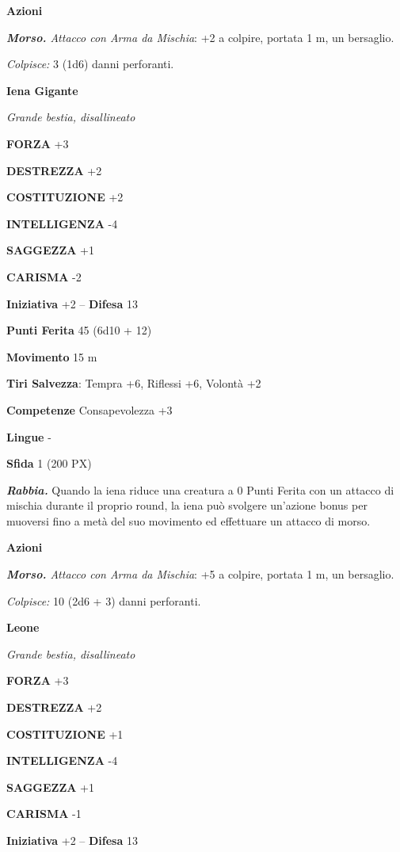 \begin{multicols}{2}
	\textbf{Azioni}

	\textit{\textbf{Morso.} Attacco con Arma da Mischia}: +2 a colpire, portata 1 m, un bersaglio.

	\textit{Colpisce:} 3 (1d6) danni perforanti.

	\medskip\textbf{Iena Gigante}

	\textit{Grande bestia, disallineato}

	\textbf{FORZA} +3

	\textbf{DESTREZZA} +2

	\textbf{COSTITUZIONE} +2

	\textbf{INTELLIGENZA} -4

	\textbf{SAGGEZZA} +1

	\textbf{CARISMA} -2

	\textbf{Iniziativa} +2 -- \textbf{Difesa} 13

	\textbf{Punti Ferita} 45 (6d10 + 12)

	\textbf{Movimento} 15 m

	\textbf{Tiri Salvezza}: Tempra +6, Riflessi +6, Volontà +2

	\textbf{Competenze} Consapevolezza +3

	\textbf{Lingue} -

	\textbf{Sfida} 1 (200 PX)

	\textit{\textbf{Rabbia.}} Quando la iena riduce una creatura a 0 Punti Ferita con un attacco di mischia durante il proprio round, la iena può svolgere un'azione bonus per muoversi fino a metà del suo movimento ed effettuare un attacco di morso.

	\textbf{Azioni}

	\textit{\textbf{Morso.} Attacco con Arma da Mischia}: +5 a colpire, portata 1 m, un bersaglio.

	\textit{Colpisce:} 10 (2d6 + 3) danni perforanti.

	\medskip\textbf{Leone}

	\textit{Grande bestia, disallineato}

	\textbf{FORZA} +3

	\textbf{DESTREZZA} +2

	\textbf{COSTITUZIONE} +1

	\textbf{INTELLIGENZA} -4

	\textbf{SAGGEZZA} +1

	\textbf{CARISMA} -1

	\textbf{Iniziativa} +2 -- \textbf{Difesa} 13


\end{multicols}
